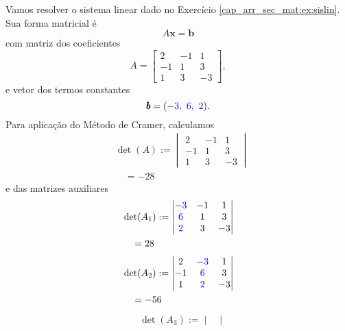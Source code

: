 \begin{ex}
  Vamos resolver o sistema linear dado no Exercício \ref{cap_arr_sec_mat:ex:sislin}. Sua forma matricial é
  \begin{equation}
    A\pmb{x} = \pmb{b}
  \end{equation}
  com matriz dos coeficientes
  \begin{equation}
        A =
    \begin{bmatrix}
      2 & -1 & 1\\
      -1 & 1 & 3\\
      1 & 3 & -3
    \end{bmatrix},
  \end{equation}
  e vetor dos termos constantes
  \begin{equation}
    \pmb{b} = ({\color{blue}-3, ~6, ~2}).
  \end{equation}
  Para aplicação do Método de Cramer, calculamos
  \begin{align}
    & \det(A) :=
              \begin{vmatrix}
                2 & -1 & 1\\
                -1 & 1 & 3\\
                1 & 3 & -3
              \end{vmatrix}\\
    & \text{}\quad = -28
  \end{align}
  e das matrizes auxiliares
  \begin{align}
    & \det(A_1) :=
              \begin{vmatrix}
                {\color{blue}-3} & -1 & 1\\
                {\color{blue}6} & 1 & 3\\
                {\color{blue}2} & 3 & -3
              \end{vmatrix}\\
    & \text{}\quad = 28
  \end{align}
  \begin{align}
    & \det(A_2) :=
              \begin{vmatrix}
                2 & {\color{blue}-3} & 1\\
                -1 & {\color{blue}6} & 3\\
                1 & {\color{blue}2} & -3
              \end{vmatrix}\\
    & \text{}\quad = -56
  \end{align}
  \begin{align}
    & \det(A_3) :=
              \begin{vmatrix}

\end{vmatrix}
\end{align}
\end{ex}

